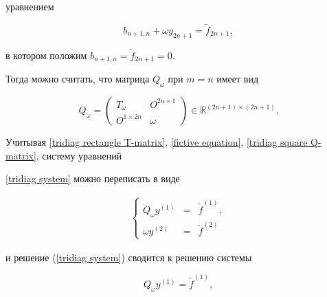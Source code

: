 уравнением

\begin{equation}

\label{fictive equation} b_{n+1,n} + {\omega} y_{2n+1} = \widetilde{f}_{2n+1},

\end{equation}

в котором положим $b_{n+1,n}=\widetilde{f}_{2n+1} = 0$.

Тогда можно считать, что матрица $Q_{\omega}$ при $m=n$ имеет вид

\begin{equation}

\label{tridiag square Q-matrix} Q_{\omega} = \left(

\begin{array}{cc}

T_{\omega} & O^{2n \times 1} \\

O^{1 \times 2n} & {\omega}

\end{array}

\right) \in {\mathbb{R}}^{(2n+1) \times (2n+1)}.

\end{equation}

Учитывая \eqref{tridiag rectangle T-matrix}, \eqref{fictive equation}, \eqref{tridiag square Q-matrix}, систему уравнений

\eqref{tridiag system} можно переписать в виде

\begin{gather*}

\left\{

\begin{array}{rcl}

Q_{\omega} y^{(1)} & = &  \widetilde{f}^{(1)}, \\

{\omega} y^{(2)} & = & \widetilde{f}^{(2)}

\end{array}

\right.

\end{gather*}

и решение (\ref{tridiag system}) сводится к решению системы

\begin{equation}

\label{Q-system} Q_{\omega} y^{(1)} = \widetilde{f}^{(1)},

\end{equation}

